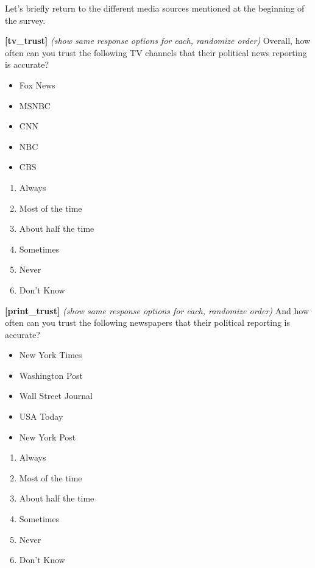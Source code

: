 \documentclass[
]{article}
\providecommand{\tightlist}{%
  \setlength{\itemsep}{0pt}\setlength{\parskip}{0pt}}
\begin{document}
Let's briefly return to the different media sources mentioned at the
beginning of the survey.

\textbf{{[}tv\_trust{]}} \emph{(show same response options for each,
randomize order)} Overall, how often can you trust the following TV
channels that their political news reporting is accurate?

\begin{itemize}
\tightlist
\item
  Fox News
\item
  MSNBC
\item
  CNN
\item
  NBC
\item
  CBS
\end{itemize}

\begin{enumerate}
\def\labelenumi{\arabic{enumi}.}
\tightlist
\item
  Always
\item
  Most of the time
\item
  About half the time
\item
  Sometimes
\item
  Never
\item
  Don't Know
\end{enumerate}

\textbf{{[}print\_trust{]}} \emph{(show same response options for each,
randomize order)} And how often can you trust the following newspapers
that their political reporting is accurate?

\begin{itemize}
\tightlist
\item
  New York Times
\item
  Washington Post
\item
  Wall Street Journal
\item
  USA Today
\item
  New York Post
\end{itemize}

\begin{enumerate}
\def\labelenumi{\arabic{enumi}.}
\tightlist
\item
  Always
\item
  Most of the time
\item
  About half the time
\item
  Sometimes
\item
  Never
\item
  Don't Know
\end{enumerate}
\end{document}
